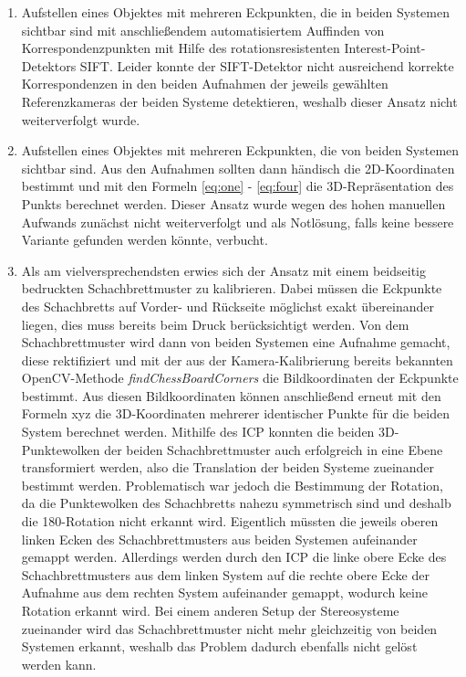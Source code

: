 \begin{enumerate}
	\item Aufstellen eines Objektes mit mehreren Eckpunkten, die in beiden Systemen sichtbar sind mit anschließendem automatisiertem Auffinden von Korrespondenzpunkten mit Hilfe des rotationsresistenten Interest-Point-Detektors SIFT. Leider konnte der SIFT-Detektor nicht ausreichend korrekte Korrespondenzen in den beiden Aufnahmen der jeweils gewählten Referenzkameras der beiden Systeme detektieren, weshalb dieser Ansatz nicht weiterverfolgt wurde.
	
	
	\item Aufstellen eines Objektes mit mehreren Eckpunkten, die von beiden Systemen sichtbar sind. Aus den Aufnahmen sollten dann händisch die 2D-Koordinaten bestimmt und mit den Formeln 
	\ref{eq:one} - \ref{eq:four} die 3D-Repräsentation des Punkts berechnet werden. Dieser Ansatz wurde wegen des hohen manuellen Aufwands zunächst nicht weiterverfolgt und als Notlösung, falls keine bessere Variante gefunden werden könnte, verbucht. 
	
	\item Als am vielversprechendsten erwies sich der Ansatz mit einem beidseitig bedruckten Schachbrettmuster zu kalibrieren. Dabei müssen die Eckpunkte des Schachbretts auf Vorder- und Rückseite möglichst exakt übereinander liegen, dies muss bereits beim Druck berücksichtigt werden. Von dem Schachbrettmuster wird dann von beiden Systemen eine Aufnahme gemacht, diese rektifiziert und mit der aus der Kamera-Kalibrierung bereits bekannten OpenCV-Methode \textit{findChessBoardCorners} die Bildkoordinaten der Eckpunkte bestimmt. Aus diesen Bildkoordinaten können anschließend erneut mit den Formeln xyz die 3D-Koordinaten mehrerer identischer Punkte für die beiden System berechnet werden. \newline 
	\noindent Mithilfe des ICP konnten die beiden 3D-Punktewolken der beiden Schachbrettmuster auch erfolgreich in eine Ebene transformiert werden, also die Translation der beiden Systeme zueinander bestimmt werden. Problematisch war jedoch die Bestimmung der Rotation, da die Punktewolken des Schachbretts nahezu symmetrisch sind und deshalb die 180\degree-Rotation nicht erkannt wird. Eigentlich müssten die jeweils oberen linken Ecken des Schachbrettmusters aus beiden Systemen aufeinander gemappt werden. Allerdings werden durch den ICP die linke obere Ecke des Schachbrettmusters aus dem linken System auf die rechte obere Ecke der Aufnahme aus dem rechten System aufeinander gemappt, wodurch keine Rotation erkannt wird. Bei einem anderen Setup der Stereosysteme zueinander wird das Schachbrettmuster nicht mehr gleichzeitig von beiden Systemen erkannt, weshalb das Problem dadurch ebenfalls nicht gelöst werden kann.
	
\end{enumerate}


